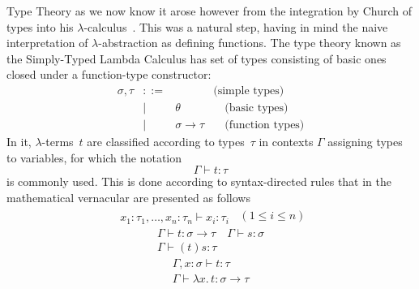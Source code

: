 \documentclass[11pt,twocolumn]{article}
\newcommand{\lcalculus}{\mbox{$\lambda$-calculus}}
\begin{document}
Type Theory as we now know it arose however from the integration by Church
of types into his \lcalculus~\cite{Church1940}.  This was a natural step,
having in mind the naive interpretation of \mbox{$\lambda$-abstraction} as
defining functions.  The type theory known as the Simply-Typed Lambda
Calculus has set of types consisting of basic ones closed under a
function-type constructor:
  \[\begin{array}{rcll}
    \sigma,\tau & ::= & & \mbox{(simple types)}\\
    & \mid & \theta & \quad\mbox{(basic types)}\\
    & \mid & \sigma\to\tau & \quad\mbox{(function types)}
  \end{array}\]
In it, \mbox{$\lambda$-terms}~$t$ are classified according to types~$\tau$ in
contexts $\Gamma$ assigning types to variables, for which the notation
  \[
  \Gamma\vdash t:\tau
\]
is commonly used.  This is done according to syntax-directed rules that in the
mathematical vernacular are presented as follows
  \[\begin{array}{c}
    \\ \hline
    x_1:\tau_1,\ldots,x_n:\tau_n\vdash x_i:\tau_i
  \end{array}
  \enspace(1\leq i\leq n)
  \]
  \[\begin{array}{c}
    \Gamma\vdash t:\sigma\to\tau
    \quad 
    \Gamma\vdash s:\sigma
    \\ \hline
    \Gamma\vdash (t)s:\tau
  \end{array}\]
  \begin{equation}\label{LambdaAbstraction} 
  \begin{array}{c}
    \Gamma,x:\sigma\vdash t:\tau
    \\ \hline
    \Gamma\vdash\lambda x.\,t:\sigma\to\tau
  \end{array}
\end{equation}
\end{document}
